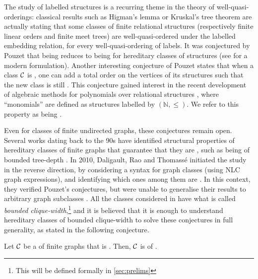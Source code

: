 \AP The study of labelled structures is a recurring theme in the theory of
well-quasi-orderings: classical results such as Higman's lemma \cite{HIG52} or
Kruskal's tree theorem \cite{KRUSK60} are actually stating that some classes of
finite relational structures (respectively finite linear orders and finite meet
trees) are well-quasi-ordered under the labelled embedding relation, for every
well-quasi-ordering of labels. It was conjectured by Pouzet \cite{POUZ72} that
being  reduces to being
 for hereditary classes of structures (see
\cite[Problems 9, (1)]{Pouzet24} for a modern formulation). Another interesting
conjecture of Pouzet \cite[Problems 12]{Pouzet24} states that when a class
$\Cls$ is , one can add a total order on the
vertices of its structures such that the new class is still
. 
 This conjecture gained interest in the
recent development of algebraic methods for polynomials over relational
structures \cite[Section 3, Theorem 11 and 12]{GHOLAS24}, where ``monomials''
are defined as structures labelled by $(\mathbb{N}, \leq)$. We refer 
to this property as being .


\AP Even for classes of finite undirected graphs, these conjectures remain
open. Several works dating back to the 90s have identified structural
properties of hereditary classes of finite graphs that guarantee that they are
, such as being of bounded tree-depth
\cite{DING92}. In 2010, Daligault, Rao and Thomassé \cite{DRT10} initiated the
study in the reverse direction, by considering a syntax for graph classes
(using NLC graph expressions), and identifying which ones among them are
. In this context, they verified Pouzet's
conjectures, but were unable to generalise their results to arbitrary graph
subclasses \cite[Conjecture 4]{DRT10}. All the classes considered in \cite{DRT10}
have what is called \emph{bounded clique-width},\footnote{This will be defined
formally in \cref{sec:prelims}} and it is believed that it is enough to
understand hereditary classes of bounded clique-width to solve these
conjectures in full generality, as stated in the following conjecture.

\begin{conjecture}
    \label{cwqo:conj}
    Let $\Cls$ be a  of finite graphs that is .
    Then, $\Cls$ is of .
\end{conjecture}


